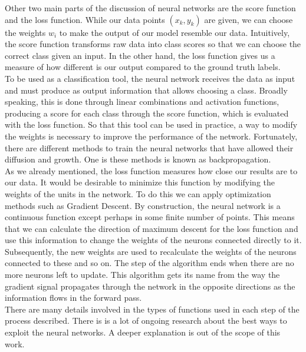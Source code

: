 Other two main parts of the discussion of neural networks are the score function and the loss function. While our data points $(x_k, y_k)$ are given, we can choose the weights $w_i$ to make the output of our model resemble our data. Intuitively, the score function transforms raw data into class scores so that we can choose the correct class given an input. In the other hand, the loss function gives us a measure of how different is our output compared to the ground truth labels.
\\

To be used as a classification tool, the neural network receives the data as input and must produce as output information that allows choosing a class. Broadly speaking, this is done through linear combinations and activation functions, producing a score for each class through the score function, which is evaluated with the loss function. So that this tool can be used in practice, a way to modify the weights is necessary to improve the performance of the network. Fortunately, there are different methods to train the neural networks that have allowed their diffusion and growth. One is these methods is known as backpropagation.\\

As we already mentioned, the loss function measures how close our results are to our data. It would be desirable to minimize this function by modifying the weights of the units in the network. To do this we can apply optimization methods such as Gradient Descent. By construction, the neural network is a continuous function except perhaps in some finite number of points. This means that we can calculate the direction of maximum descent for the loss function and use this information to change the weights of the neurons connected directly to it. Subsequently, the new weights are used to recalculate the weights of the neurons connected to these and so on. The step of the algorithm ends when there are no more neurons left to update. This algorithm gets its name from the way the gradient signal propagates through the network in the opposite directions as the information flows in the forward pass.\\

There are many details involved in the types of functions used in each step of the process described. There is is a lot of ongoing research about the best ways to exploit the neural networks. A deeper explanation is out of the scope of this work.\\


